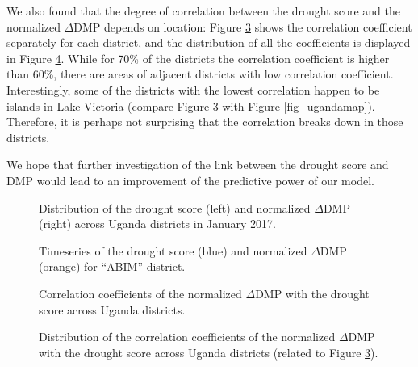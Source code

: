 \documentclass[10pt,parskip=half,
toc=sectionentrywithdots,
bibliography=totocnumbered,
captions=tableheading,numbers=noendperiod]{scrartcl}
\begin{document}
We also found that the degree of correlation between the drought score
and the normalized \(\Delta\)DMP depends on location: Figure
\ref{fig_dmp_corr_districts} shows the correlation coefficient
separately for each district, and the distribution of all the
coefficients is displayed in Figure \ref{fig_dmp_corr_distribution}.
While for 70\% of the districts the correlation coefficient is higher
than 60\%, there are areas of adjacent districts with low correlation
coefficient. Interestingly, some of the districts with the lowest
correlation happen to be islands in Lake Victoria (compare Figure
\ref{fig_dmp_corr_districts} with Figure \ref{fig_ugandamap}).
Therefore, it is perhaps not surprising that the correlation breaks down
in those districts.

We hope that further investigation of the link between the drought score
and DMP would lead to an improvement of the predictive power of our
model.

\begin{figure}[H]\begin{center}\end{center}\caption{Distribution of the drought score (left) and normalized \(\Delta\)DMP
(right) across Uganda districts in January 2017.}\label{fig_dmp_2017}\end{figure}

\begin{figure}[H]\begin{center}\end{center}\caption{Timeseries of the drought score (blue) and normalized \(\Delta\)DMP
(orange) for ``ABIM'' district.}\label{fig_dmp_abim}\end{figure}

\begin{figure}[H]\begin{center}\end{center}\caption{Correlation coefficients of the normalized \(\Delta\)DMP with the
drought score across Uganda districts.}\label{fig_dmp_corr_districts}\end{figure}

\begin{figure}[H]\begin{center}\end{center}\caption{Distribution of the correlation coefficients of the normalized
\(\Delta\)DMP with the drought score across Uganda districts (related to
Figure \ref{fig_dmp_corr_districts}).}\label{fig_dmp_corr_distribution}\end{figure}
\end{document}
